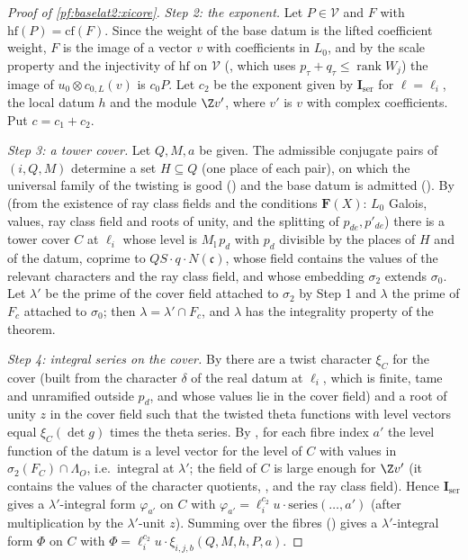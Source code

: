 \begin{proof}[Proof of \cref{pf:baselat2:xicore}]
\emph{Step 2: the exponent.} Let $P\in\mathcal V$ and $F$ with $\mathrm{hf}(P)=\mathrm{cf}(F)$. Since the weight of the base datum
is the lifted coefficient weight, $F$ is the image of a vector $v$ with coefficients in $L_0$, and by the scale
property and the injectivity of $\mathrm{hf}$ on $\mathcal V$ (,
which uses $p_\tau+q_\tau\le\operatorname{rank}W_j$) the image of $u_0\otimes c_{0,L}(v)$ is $c_0P$. Let $c_2$ be the exponent
given by $\mathbf I_{\mathrm{ser}}$ for $\ell=\ell_i$, the local datum $h$ and the module $\Z v'$, where $v'$ is $v$ with complex
coefficients. Put $c=c_1+c_2$.

\emph{Step 3: a tower cover.} Let $Q,M,a$ be given. The admissible conjugate pairs of $(i,Q,M)$ determine a set
$H\subseteq Q$ (one place of each pair), on which the universal family of the twisting is good
() and the base datum is admitted
(). By
 (from the existence of ray class fields and the
conditions $\mathbf F(X)$: $L_0$ Galois, values, ray class field and roots of unity, and the splitting of
$p_{de},p'_{de}$) there is a tower cover $C$ at $\ell_i$ whose level is $M_{\mathrm{l}}\,p_d$ with $p_d$ divisible by the
places of $H$ and of the datum, coprime to $QS\cdot q\cdot N(\mathfrak c)$, whose field contains the values of the relevant
characters and the ray class field, and whose embedding $\sigma_2$ extends $\sigma_0$. Let $\lambda'$ be the prime of the cover field attached to $\sigma_2$
by Step 1 and $\lambda$ the prime of $F_c$ attached to $\sigma_0$; then $\lambda=\lambda'\cap F_c$, and $\lambda$ has the integrality
property of the theorem.

\emph{Step 4: integral series on the cover.} By  there are a twist
character $\xi_C$ for the cover (built from the character $\delta$ of the real datum at $\ell_i$, which is finite,
tame and unramified outside $p_d$, and whose values lie in the cover field) and a root of unity $z$ in the cover
field such that the twisted theta functions with level vectors equal $\xi_C(\det g)$ times the theta series. By
, for each fibre index $a'$ the level function of the datum is
a level vector for the level of $C$ with values in $\sigma_2(F_C)\cap\Lambda_O$, i.e.\ integral at $\lambda'$; the field of $C$ is
large enough for $\Z v'$ (it contains the values of the character quotients,
, and the ray
class field). Hence $\mathbf I_{\mathrm{ser}}$ gives a $\lambda'$-integral form $\varphi_{a'}$ on $C$ with
$\varphi_{a'}=\ell_i^{c_2}u\cdot\mathrm{series}(\dots,a')$ (after multiplication by the $\lambda'$-unit $z$). Summing over the
fibres () gives a $\lambda'$-integral form $\Phi$ on $C$ with
$\Phi=\ell_i^{c_2}u\cdot\xi_{i,j,b}(Q,M,h,P,a)$.


\end{proof}

